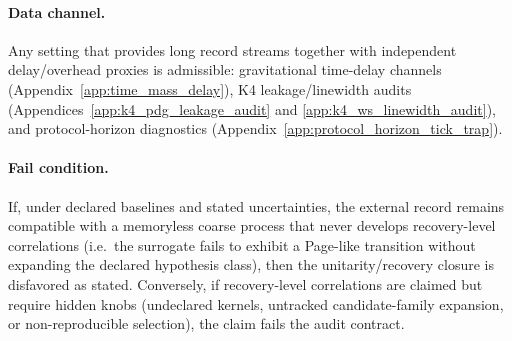 \paragraph{Data channel.}
Any setting that provides long record streams together with independent delay/overhead proxies is admissible:
gravitational time-delay channels (Appendix~\ref{app:time_mass_delay}), K4 leakage/linewidth audits (Appendices~\ref{app:k4_pdg_leakage_audit} and \ref{app:k4_ws_linewidth_audit}), and protocol-horizon diagnostics (Appendix~\ref{app:protocol_horizon_tick_trap}).

\paragraph{Fail condition.}
If, under declared baselines and stated uncertainties, the external record remains compatible with a memoryless coarse process that never develops recovery-level correlations (i.e.\ the surrogate fails to exhibit a Page-like transition without expanding the declared hypothesis class),
then the unitarity/recovery closure is disfavored as stated.
Conversely, if recovery-level correlations are claimed but require hidden knobs (undeclared kernels, untracked candidate-family expansion, or non-reproducible selection), the claim fails the audit contract.
